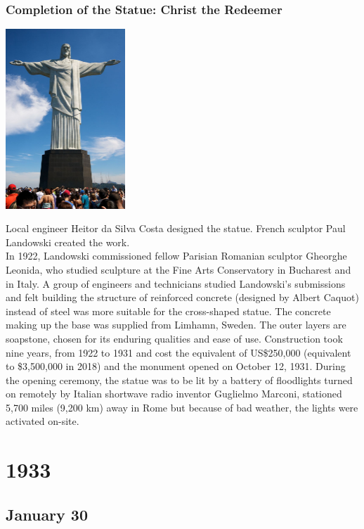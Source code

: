 \documentclass[11pt]{report}
\begin{document}
\subsection{Completion of the Statue: Christ the Redeemer}
\vspace{2mm}\begin{center}\includegraphics[width=4.5cm]{./img/christStatue.jpg}\end{center}
Local engineer Heitor da Silva Costa designed the statue. French sculptor Paul Landowski created the work.\\ \indent In 1922, Landowski commissioned fellow Parisian Romanian sculptor Gheorghe Leonida, who studied sculpture at the Fine Arts Conservatory in Bucharest and in Italy.
A group of engineers and technicians studied Landowski's submissions and felt building the structure of reinforced concrete (designed by Albert Caquot) instead of steel was more suitable for the cross-shaped statue. The concrete making up the base was supplied from Limhamn, Sweden. The outer layers are soapstone, chosen for its enduring qualities and ease of use. Construction took nine years, from 1922 to 1931 and cost the equivalent of US\$250,000 (equivalent to \$3,500,000 in 2018) and the monument opened on October 12, 1931. During the opening ceremony, the statue was to be lit by a battery of floodlights turned on remotely by Italian shortwave radio inventor Guglielmo Marconi, stationed 5,700 miles (9,200 km) away in Rome but because of bad weather, the lights were activated on-site.

\chapter{1933}
\section{January 30}
\end{document}
